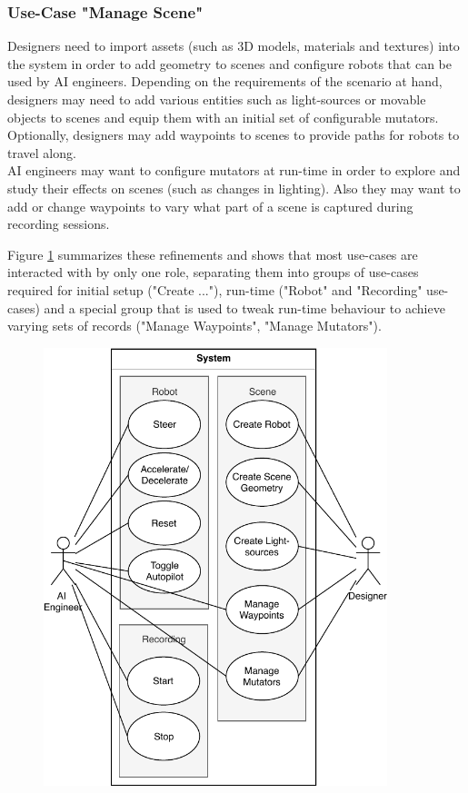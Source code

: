 \subsubsection{Use-Case "Manage Scene"}
Designers need to import assets (such as 3D models, materials and textures) into the system in order to add geometry to scenes and configure robots that can be used by \acs{AI} engineers. Depending on the requirements of the scenario at hand, designers may need to add various entities such as light-sources or movable objects to scenes and equip them with an initial set of configurable mutators. Optionally, designers may add waypoints to scenes to provide paths for robots to travel along.\\
\acs{AI} engineers may want to configure mutators at run-time in order to explore and study their effects on scenes (such as changes in lighting). Also they may want to add or change waypoints to vary what part of a scene is captured during recording sessions.

Figure \ref{fig:use-cases} summarizes these refinements and shows that most use-cases are interacted with by only one role, separating them into groups of use-cases required for initial setup ("Create ..."), run-time ("Robot" and "Recording" use-cases) and a special group that is used to tweak run-time behaviour to achieve varying sets of records ("Manage Waypoints", "Manage Mutators"). 
\begin{figure}[h]
    \centering
    \includegraphics[width=10cm]{tex/img/ch04/UseCases_Fine.pdf}
    \label{fig:use-cases}
\end{figure}
\clearpage

